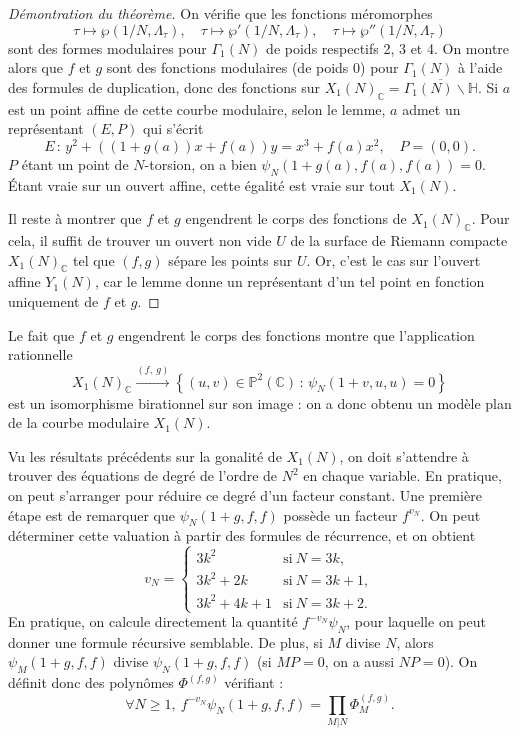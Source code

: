 \documentclass[11pt,a4paper]{article}
\newcommand{\C}{\mathbb{C}}
\renewcommand{\H}{\mathbb{H}}
\renewcommand{\P}{\mathbb{P}}
\newcommand{\vers}{\longrightarrow}
\newcommand{\de}{\,:\,}
\theoremstyle{definition}
\begin{document}
\begin{proof}[Démontration du théorème] On vérifie que les fonctions méromorphes
$$\tau\mapsto \wp(1/N, \Lambda_\tau),\quad \tau\mapsto\wp'(1/N,\Lambda_\tau),\quad \tau\mapsto\wp''(1/N, \Lambda_\tau)$$
sont des formes modulaires pour $\Gamma_1(N)$ de poids respectifs 2, 3 et 4. On montre alors que $f$ et $g$ sont des fonctions modulaires (de poids 0) pour $\Gamma_1(N)$ à l'aide des formules de duplication, donc des fonctions sur $X_1(N)_\C = \overline{\Gamma_1(N)\backslash \H}$. Si $a$ est un point affine de cette courbe modulaire, selon le lemme, $a$ admet un représentant $(E, P)$ qui s'écrit
$$E\de y^2 + ((1 + g(a))x + f(a))y = x^3 + f(a)x^2,\quad P = (0, 0).$$
$P$ étant un point de $N$-torsion, on a bien $\psi_N(1+g(a), f(a), f(a)) = 0$. \'Etant vraie sur un ouvert affine, cette égalité est vraie sur tout $X_1(N)$.

Il reste à montrer que $f$ et $g$ engendrent le corps des fonctions de $X_1(N)_\C$. Pour cela, il suffit de trouver un ouvert non vide $U$ de la surface de Riemann compacte $X_1(N)_\C$ tel que $(f, g)$ sépare les points sur $U$. Or, c'est le cas sur l'ouvert affine $Y_1(N)$, car le lemme donne un représentant d'un tel point en fonction uniquement de $f$ et $g$.
\end{proof}

Le fait que $f$ et $g$ engendrent le corps des fonctions montre que l'application rationnelle
$$X_1(N)_\C \overset{(f,\ g)}{\vers} \left\{(u, v)\in \P^2(\C) \de \psi_N(1+v, u, u) = 0\right\}$$
est un isomorphisme birationnel sur son image : on a donc obtenu un modèle plan de la courbe modulaire $X_1(N)$.

Vu les résultats précédents sur la gonalité de $X_1(N)$, on doit s'attendre à trouver des équations de degré de l'ordre de $N^2$ en chaque variable. En pratique, on peut s'arranger pour réduire ce degré d'un facteur constant. Une première étape est de remarquer que $\psi_N(1+g, f, f)$ possède un facteur $f^{v_N}.$ On peut déterminer cette valuation à partir des formules de récurrence, et on obtient
$$ v_N =
\begin{cases}
3k^2 & \text{si}\ N = 3k, \\
3k^2 + 2k &\text{si}\ N = 3k+1, \\
3k^2 + 4k + 1 &\text{si}\ N = 3k+2.
\end{cases}$$
En pratique, on calcule directement la quantité $f^{-v_N}\psi_N$, pour laquelle on peut donner une formule récursive semblable. De plus, si $M$ divise $N$, alors $\psi_M(1+g, f, f)$ divise $\psi_N(1+g, f, f)$ (si $MP = 0$, on a aussi $NP = 0$). On définit donc des polynômes $\Phi^{(f, g)}$ vérifiant :
$$\forall N\geq 1,\ f^{-v_N} \psi_N(1+g, f, f) = \prod_{M | N} \Phi_M^{(f, g)}.$$
\end{document}
